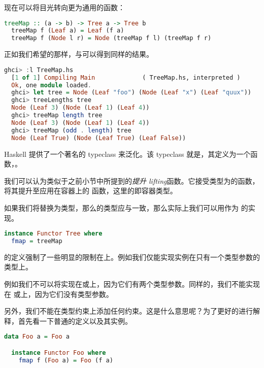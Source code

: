 \documentclass[./main.tex]{subfiles}
\begin{document}
现在可以将目光转向更为通用的函数：

\begin{lstlisting}[language=Haskell]
  treeMap :: (a -> b) -> Tree a -> Tree b
  treeMap f (Leaf a) = Leaf (f a)
  treeMap f (Node l r) = Node (treeMap f l) (treeMap f r)
\end{lstlisting}

正如我们希望的那样，与可以得到同样的结果。

\begin{lstlisting}[language=Haskell]
  ghci> :l TreeMap.hs
  [1 of 1] Compiling Main             ( TreeMap.hs, interpreted )
  Ok, one module loaded.
  ghci> let tree = Node (Leaf "foo") (Node (Leaf "x") (Leaf "quux"))
  ghci> treeLengths tree
  Node (Leaf 3) (Node (Leaf 1) (Leaf 4))
  ghci> treeMap length tree
  Node (Leaf 3) (Node (Leaf 1) (Leaf 4))
  ghci> treeMap (odd . length) tree
  Node (Leaf True) (Node (Leaf True) (Leaf False))
\end{lstlisting}

Haskell 提供了一个著名的 typeclass 来泛化。该 typeclass 就是，其定义为一个函数，。

我们可以认为类似于之前小节中所提到的\textit{提升 lifting}函数。它接受类型为的函数，将其提升至应用在容器上的
函数，这里的即容器类型。

如果我们将替换为类型，那么的类型应与一致，那么实际上我们可以用作为
的实现。

\begin{lstlisting}[language=Haskell]
  instance Functor Tree where
  fmap = treeMap
\end{lstlisting}

的定义强制了一些明显的限制在上。例如我们仅能实现实例在只有一个类型参数的类型上。

例如我们不可以将实现在或上，因为它们有两个类型参数。同样的，我们不能实现在
或上，因为它们没有类型参数。

另外，我们不能在类型约束上添加任何约束。这是什么意思呢？为了更好的进行解释，首先看一下普通的定义以及其实例。

\begin{lstlisting}[language=Haskell]
  data Foo a = Foo a

  instance Functor Foo where
    fmap f (Foo a) = Foo (f a)
\end{lstlisting}
\end{document}
